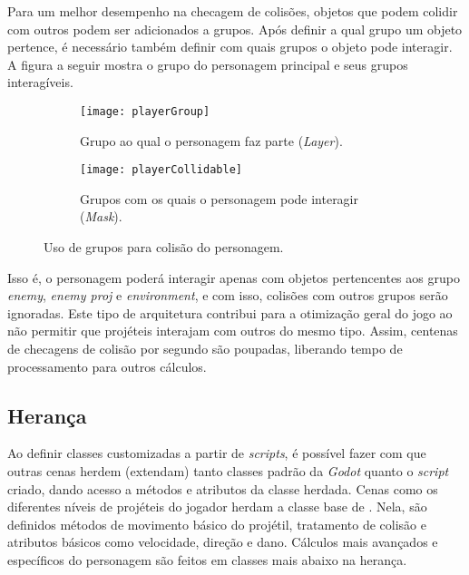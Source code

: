 Para um melhor desempenho na checagem de colisões, objetos que podem colidir com outros podem ser adicionados a grupos. Após definir a qual grupo um objeto pertence, é necessário também definir com quais grupos o objeto pode interagir. A figura a seguir mostra o grupo do personagem principal e seus grupos interagíveis.

\begin{figure}
    \centering
  
    \begin{subfigure}{0.4\textwidth}
        \centering
            \texttt{[image: playerGroup]}
        \caption{Grupo ao qual o personagem faz parte (\textit{Layer}).}
    \end{subfigure}
    \begin{subfigure}{0.4\textwidth}
        \centering
            \texttt{[image: playerCollidable]}
        \caption{Grupos com os quais o personagem pode interagir (\textit{Mask}).}
    \end{subfigure}
  
    \caption{Uso de grupos para colisão do personagem.}
\end{figure}

Isso é, o personagem poderá interagir apenas com objetos pertencentes aos grupo \textit{enemy}, \textit{enemy proj} e \textit{environment}, e com isso, colisões com outros grupos serão ignoradas. Este tipo de arquitetura contribui para a otimização geral do jogo ao não permitir que projéteis interajam com outros do mesmo tipo. Assim, centenas de checagens de colisão por segundo são poupadas, liberando tempo de processamento para outros cálculos.

\subsection{Herança}

Ao definir classes customizadas a partir de \textit{scripts}, é possível fazer com que outras cenas herdem (extendam) tanto classes padrão da \textit{Godot} quanto o \textit{script} criado, dando acesso a métodos e atributos da classe herdada. Cenas como os diferentes níveis de projéteis do jogador herdam a classe base de \textquotedbl{}. Nela, são definidos métodos de movimento básico do projétil, tratamento de colisão e atributos básicos como velocidade, direção e dano. Cálculos mais avançados e específicos do personagem são feitos em classes mais abaixo na herança.

